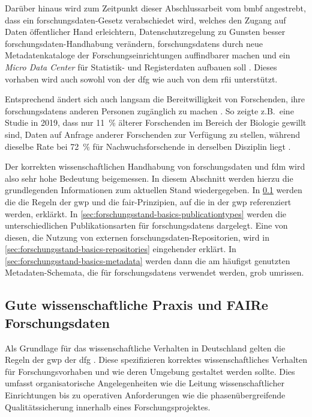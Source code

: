 Darüber hinaus wird zum Zeitpunkt dieser Abschlussarbeit vom \gls{bmbf} angestrebt, dass ein \gls{forschungsdaten}-Gesetz verabschiedet wird, welches den Zugang auf Daten öffentlicher Hand erleichtern, Datenschutzregelung zu Gunsten besser \gls{forschungsdaten}-Handhabung verändern, \glspl{forschungsdaten} durch neue Metadatenkataloge der Forschungseinrichtungen auffindbarer machen und ein \textit{Micro Data Center} für Statistik- und Registerdaten aufbauen soll \autocite{bmbf2024}.
Dieses vorhaben wird auch sowohl von der \gls{dfg} \autocite{dfg2023-gesetz} wie auch von dem \gls{rfii} \autocite{rfii-gesetz} unterstützt.

Entsprechend ändert sich auch langsam die Bereitwilligkeit von Forschenden, ihre \glspl{forschungsdaten} anderen Personen zugänglich zu machen \autocite{Kaden2018}.
So zeigte z.B.~eine Studie in 2019, dass nur \SI{11}{\percent} älterer Forschenden im Bereich der Biologie gewillt sind, Daten auf Anfrage anderer Forschenden zur Verfügung zu stellen, während dieselbe Rate bei \SI{72}{\percent} für Nachwuchsforschende in derselben Disziplin liegt \autocite{Campbell2019}.


Der korrekten wissenschaftlichen Handhabung von \gls{forschungsdaten} und \gls{fdm} wird also sehr hohe Bedeutung beigemessen.
In diesem Abschnitt werden hierzu die grundlegenden Informationen zum aktuellen Stand wiedergegeben.
In \cref{sec:forschungsstand-basics-gwp-fair} werden die die Regeln der \gls{gwp} und die \gls{fair}-Prinzipien, auf die in der \gls{gwp} referenziert werden, erklärkt.
In \cref{sec:forschungsstand-basics-publicationtypes} werden die unterschiedlichen Publikationsarten für \glspl{forschungsdaten} dargelegt.
Eine von diesen, die Nutzung von externen \gls{forschungsdaten}-Repositorien, wird in \cref{sec:forschungsstand-basics-repositories} eingehender erklärt.
In \cref{sec:forschungsstand-basics-metadata} werden dann die am häufigst genutzten Metadaten-Schemata, die für \glspl{forschungsdaten} verwendet werden, grob umrissen.

\subsection{Gute wissenschaftliche Praxis und
FAIRe Forschungsdaten}\label{sec:forschungsstand-basics-gwp-fair}
Als Grundlage für das wissenschaftliche Verhalten in Deutschland gelten die Regeln der \gls{gwp} der \gls{dfg} \autocite{dfg-gwp}.
Diese spezifizieren korrektes wissenschaftliches Verhalten für Forschungsvorhaben und wie deren Umgebung gestaltet werden sollte.
Dies umfasst organisatorische Angelegenheiten wie die Leitung wissenschaftlicher Einrichtungen bis zu operativen Anforderungen wie die phasenübergreifende Qualitätssicherung innerhalb eines Forschungsprojektes.

